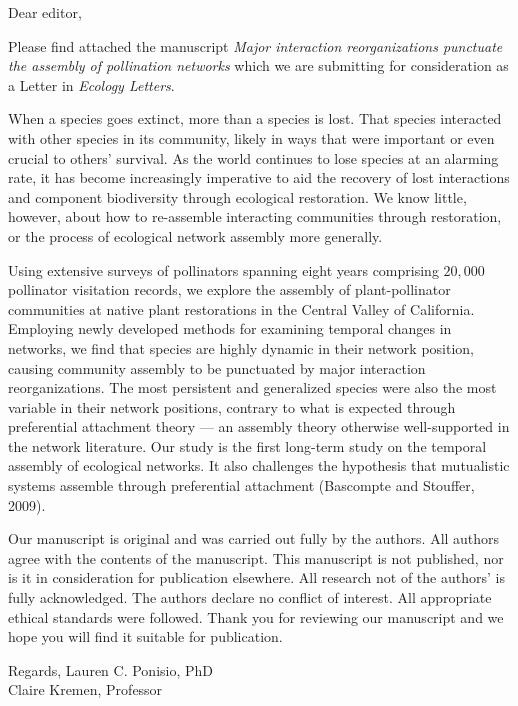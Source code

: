 \documentclass[12pt]{letter}
\begin{document}
\begin{letter}{}

  \opening{Dear editor,}

  Please find attached the manuscript \textit{Major interaction
    reorganizations punctuate the assembly of pollination networks}
  which we are submitting for consideration as a Letter in
  \textit{Ecology Letters}.

  When a species goes extinct, more than a species is lost. That
  species interacted with other species in its community, likely in
  ways that were important or even crucial to others' survival. As the
  world continues to lose species at an alarming rate, it has become
  increasingly imperative to aid the recovery of lost interactions and
  component biodiversity through ecological restoration. We know
  little, however, about how to re-assemble interacting communities
  through restoration, or the process of ecological network assembly
  more generally.

  Using extensive surveys of pollinators spanning eight years
  comprising \texttildelow $20,000$ pollinator visitation records, we
  explore the assembly of plant-pollinator communities at native plant
  restorations in the Central Valley of California. Employing newly
  developed methods for examining temporal changes in networks, we
  find that species are highly dynamic in their network position,
  causing community assembly to be punctuated by major interaction
  reorganizations. The most persistent and generalized species were
  also the most variable in their network positions, contrary to what
  is expected through preferential attachment theory --- an assembly
  theory otherwise well-supported in the network literature. Our study
  is the first long-term study on the temporal assembly of ecological
  networks. It also challenges the hypothesis that mutualistic systems
  assemble through preferential attachment (Bascompte and Stouffer,
  2009).

  Our manuscript is original and was carried out fully by the authors.
  All authors agree with the contents of the manuscript.  This
  manuscript is not published, nor is it in consideration for
  publication elsewhere.  All research not of the authors' is fully
  acknowledged.  The authors declare no conflict of interest. All
  appropriate ethical standards were followed.  Thank you for
  reviewing our manuscript and we hope you will find it suitable for
  publication.
  
  Regards,
  Lauren C. Ponisio, PhD\\
  Claire Kremen, Professor

\end{letter}
\end{document}

